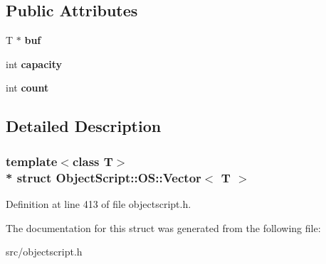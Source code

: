 \subsection*{Public Attributes}
\begin{DoxyCompactItemize}
\item 
T $\ast$ {\bfseries buf}\hypertarget{struct_object_script_1_1_o_s_1_1_vector_a70bec84e14e2f2991451795009291f20}{}\label{struct_object_script_1_1_o_s_1_1_vector_a70bec84e14e2f2991451795009291f20}

\item 
int {\bfseries capacity}\hypertarget{struct_object_script_1_1_o_s_1_1_vector_af3b3726dd6345a32742a5364ba63b294}{}\label{struct_object_script_1_1_o_s_1_1_vector_af3b3726dd6345a32742a5364ba63b294}

\item 
int {\bfseries count}\hypertarget{struct_object_script_1_1_o_s_1_1_vector_ad1da0549b9371e15c3dbace0e0611648}{}\label{struct_object_script_1_1_o_s_1_1_vector_ad1da0549b9371e15c3dbace0e0611648}

\end{DoxyCompactItemize}


\subsection{Detailed Description}
\subsubsection*{template$<$class T$>$\\*
struct Object\+Script\+::\+O\+S\+::\+Vector$<$ T $>$}



Definition at line 413 of file objectscript.\+h.



The documentation for this struct was generated from the following file\+:\begin{DoxyCompactItemize}
\item 
src/objectscript.\+h\end{DoxyCompactItemize}

